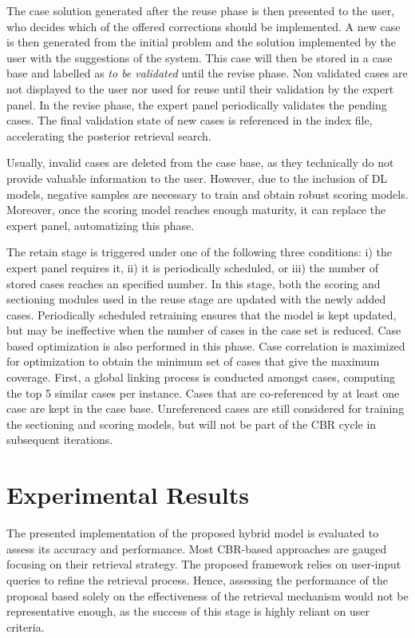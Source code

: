 The case solution generated after the reuse phase is then presented to the user, who decides which of the offered corrections should be implemented. A new case is then generated from the initial problem and the solution implemented by the user with the suggestions of the system. This case will then be stored in a case base and labelled as \textit{to be validated} until the revise phase. Non validated cases are not displayed to the user nor used for reuse until their validation by the expert panel. In the revise phase, the expert panel periodically validates the pending cases. The final validation state of new cases is referenced in the index file, accelerating the posterior retrieval search. 

Usually, invalid cases are deleted from the case base, as they technically do not provide valuable information to the user. However, due to the inclusion of DL models, negative samples are necessary to train and obtain robust scoring models. Moreover, once the scoring model reaches enough maturity, it can replace the expert panel, automatizing this phase. 

The retain stage is triggered under one of the following three conditions: i) the expert panel requires it, ii) it is periodically scheduled, or iii) the number of stored cases reaches an specified number. In this stage, both the scoring and sectioning modules used in the reuse stage are updated with the newly added cases. Periodically scheduled retraining ensures that the model is kept updated, but may be ineffective when the number of cases in the case set is reduced. Case based optimization is also performed in this phase. Case correlation is maximized for optimization to obtain the minimum set of cases that give the maximum coverage. First, a global linking process is conducted amongst cases, computing the top 5 similar cases per instance. Cases that are co-referenced by at least one case are kept in the case base. Unreferenced cases are still considered for training the sectioning and scoring models, but will not be part of the CBR cycle in subsequent iterations.


\section{Experimental Results}\label{5_sec:experimental_results}
The presented implementation of the proposed hybrid model is evaluated to assess its accuracy and performance. Most CBR-based approaches are gauged focusing on their retrieval strategy. The proposed framework relies on user-input queries to refine the retrieval process. Hence, assessing the performance of the proposal based solely on the effectiveness of the retrieval mechanism would not be representative enough, as the success of this stage is highly reliant on user criteria.

